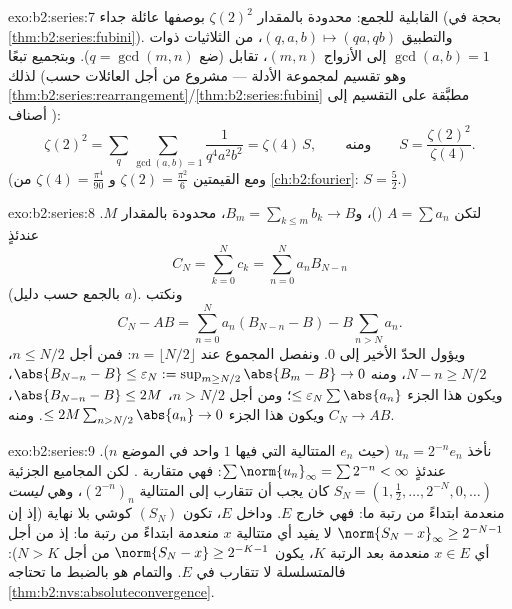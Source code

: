 \begin{solution}{exo:b2:series:7}
القابلية للجمع: محدودة بالمقدار $\zeta(2)^2$ بوصفها عائلة جداء
(بحجة  في \cref{thm:b2:series:fubini}). والتطبيق
$(q, a, b) \mapsto (qa, qb)$، من الثلاثيات ذوات $\gcd(a, b) = 1$
إلى الأزواج $(m, n)$، تقابل (ضع $q = \gcd(m,n)$). وبتجميع
 تبعًا لذلك (وهو تقسيم لمجموعة الأدلة ---
مشروع من أجل العائلات  حسب
\cref{thm:b2:series:rearrangement}/\cref{thm:b2:series:fubini}
مطبَّقة على التقسيم إلى أصناف ):
\[
\zeta(2)^2 = \sum_{q} \sum_{\gcd(a,b)=1} \frac{1}{q^4 a^2 b^2}
= \zeta(4)\, S,
\qquad\text{ومنه}\qquad
S = \frac{\zeta(2)^2}{\zeta(4)} .
\]
(ومع القيمتين $\zeta(2) = \frac{\pi^2}{6}$ و
$\zeta(4) = \frac{\pi^4}{90}$ من
\cref{ch:b2:fourier}: $S = \frac{5}{2}$.)
\end{solution}

\begin{solution}{exo:b2:series:8}
لتكن $A = \sum a_n$ ()، و$B_m = \sum_{k\leq m} b_k \to B$،
محدودة بالمقدار $M$. عندئذٍ
\[
C_N = \sum_{k=0}^{N} c_k = \sum_{n=0}^{N} a_n B_{N-n}
\]
(بالجمع حسب دليل $a$). ونكتب
\[
C_N - AB = \sum_{n=0}^{N} a_n (B_{N-n} - B) - B\sum_{n > N} a_n .
\]
ويؤول الحدّ الأخير إلى $0$. ونفصل المجموع عند $n = \lfloor N/2
\rfloor$: فمن أجل $n \leq N/2$، $N - n \geq N/2$، ومنه $\abs{B_{N-n} - B}
\leq \varepsilon_N := \sup_{m \geq N/2}\abs{B_m - B} \to 0$، ويكون
هذا الجزء $\leq \varepsilon_N \sum\abs{a_n}$؛ ومن أجل $n > N/2$،
$\abs{B_{N-n} - B} \leq 2M$، ويكون هذا الجزء $\leq 2M \sum_{n >
N/2} \abs{a_n} \to 0$. ومنه $C_N \to AB$.
\end{solution}

\begin{solution}{exo:b2:series:9}
نأخذ $u_n = 2^{-n} e_n$ (حيث $e_n$ المتتالية التي فيها $1$ واحد في
الموضع $n$). عندئذٍ $\sum \norm{u_n}_\infty = \sum 2^{-n} <
\infty$: فهي متقاربة . لكن المجاميع الجزئية $S_N =
(1, \tfrac12, \dots, 2^{-N}, 0, \dots)$ كان يجب أن تتقارب إلى
المتتالية $(2^{-n})_n$، وهي \emph{ليست} منعدمة ابتداءً من رتبة ما:
فهي خارج $E$. وداخل $E$، تكون $(S_N)$ كوشي بلا نهاية (إذ إن $\norm{S_N
- x}_\infty \geq 2^{-N-1}$ لا يفيد أي متتالية $x$ منعدمة ابتداءً من رتبة ما:
إذ من أجل أي $x \in E$ منعدمة بعد الرتبة $K$، يكون $\norm{S_N - x} \geq
2^{-K-1}$ من أجل $N > K$): فالمتسلسلة لا تتقارب في $E$.
والتمام هو بالضبط ما تحتاجه \cref{thm:b2:nvs:absoluteconvergence}.
\end{solution}

